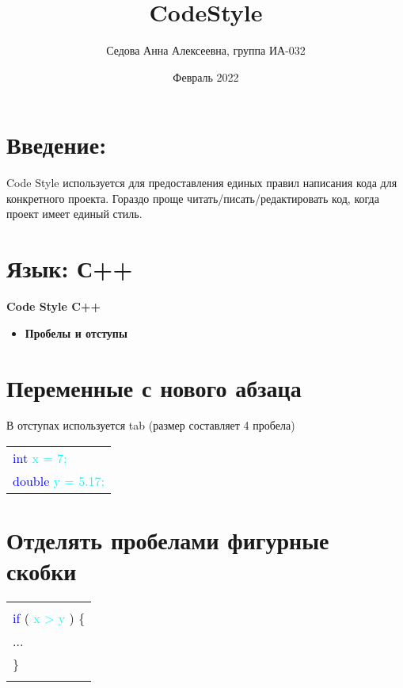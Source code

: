 \documentclass[12pt, letterpaper]{article}
\title{\textbf{CodeStyle}}
\author{Седова Анна Алексеевна, группа ИА-032}
\date{Февраль 2022}
\begin{document}
\maketitle
\newpage
\section{Введение:}
Code Style используется для предоставления единых правил написания кода для конкретного проекта. Гораздо проще читать/писать/редактировать код, когда проект имеет единый стиль.
\section{Язык: С++}

\newpage
\begin{center}
    \LARGE\textbf{Code Style C++}\hline
\end{center}

\begin{itemize}
    \item \Large\textbf{Пробелы и отступы}
\end{itemize}
\setcounter{section}{0}
\section{Переменные с нового абзаца}
В отступах используется tab (размер составляет 4 пробела)
\begin{flushleft}
\begin{tabular}{ |l| } 
 \hline
\textcolor{blue}{int} \textcolor{cyan}{x = 7;} \\
\textcolor{blue}{double} \textcolor{cyan}{y = 5.17;} \\
 \hline
\end{tabular}
\end{flushleft}
\section{Отделять пробелами фигурные скобки}
\begin{flushleft}
\begin{tabular}{ |l| } 
 \hline
\\
\textcolor{blue}{if} ( \textcolor{cyan}{x > y}  ) \{ \\
\qquad ... \\
\} \\ 
\\
 \hline
\end{tabular}
\end{flushleft}
\end{document}
